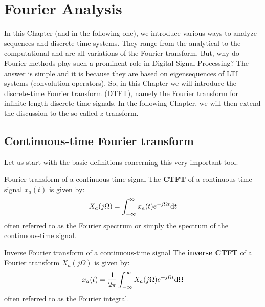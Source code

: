 \documentclass[../../main/main.tex]{subfiles}
\begin{document}
\chapter{Fourier Analysis}


In this Chapter (and in the following one), we introduce various ways to analyze sequences and discrete-time systems. They range from the analytical to the computational and are all variations of the Fourier transform. But, why do Fourier methods play such a prominent role in Digital Signal Processing? The answer is simple and it is because they are based on eigensequences of LTI systems (convolution operators). So, in this Chapter we will introduce the discrete-time Fourier transform (DTFT), namely the Fourier transform for infinite-length discrete-time signals. In the following Chapter, we will then extend the discussion to the so-called \( z \)-transform.





\section{Continuous-time Fourier transform}
Let us start with the basic definitions concerning this very important tool.

\begin{definition}{Fourier transform of a continuous-time signal}{}
    The \textbf{CTFT} of a continuous-time signal \( x_{a}(t) \) is given by:
    \begin{equation}
        X_{a}(j\Omega)
        =
        \int_{-\infty}^{\infty} x_{a}(t) e^{-j\Omega t} \mathrm{d}{t}
        \label{eq:L08_S03_1}
    \end{equation}
    often referred to as the Fourier spectrum or simply the spectrum of the continuous-time signal.
\end{definition}

\begin{definition}{Inverse Fourier transform of a continuous-time signal}{}
    The \textbf{inverse CTFT} of a Fourier transform \( X_{a}(j\Omega) \) is given by:
    \begin{equation}
        x_{a}(t)
        =
        \frac{1}{2\pi} \int_{-\infty}^{\infty} X_{a}(j\Omega) e^{+j\Omega t} \mathrm{d}{\Omega}
        \label{eq:L08_S04_1}
    \end{equation}
    often referred to as the Fourier integral.
\end{definition}
\end{document}

